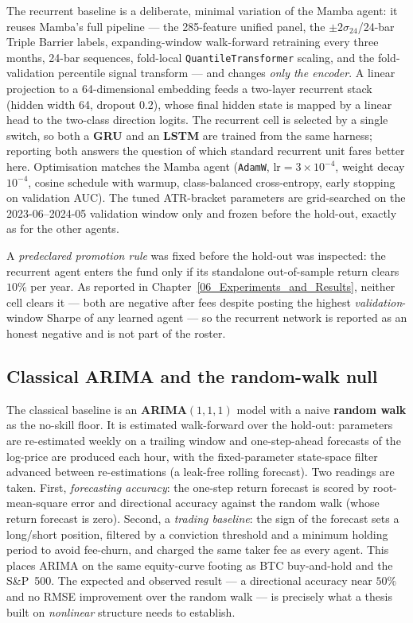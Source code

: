 The recurrent baseline is a deliberate, minimal variation of the Mamba agent: it reuses Mamba's full pipeline --- the 285-feature unified panel, the $\pm 2\sigma_{24}$/24-bar Triple Barrier labels, expanding-window walk-forward retraining every three months, 24-bar sequences, fold-local \texttt{QuantileTransformer} scaling, and the fold-validation percentile signal transform --- and changes \textit{only the encoder}. A linear projection to a 64-dimensional embedding feeds a two-layer recurrent stack (hidden width 64, dropout 0.2), whose final hidden state is mapped by a linear head to the two-class direction logits. The recurrent cell is selected by a single switch, so both a \textbf{GRU} and an \textbf{LSTM} are trained from the same harness; reporting both answers the question of which standard recurrent unit fares better here. Optimisation matches the Mamba agent (\texttt{AdamW}, $\text{lr}=3\times10^{-4}$, weight decay $10^{-4}$, cosine schedule with warmup, class-balanced cross-entropy, early stopping on validation AUC). The tuned ATR-bracket parameters are grid-searched on the 2023-06--2024-05 validation window only and frozen before the hold-out, exactly as for the other agents.


A \textit{predeclared promotion rule} was fixed before the hold-out was inspected: the recurrent agent enters the fund only if its standalone out-of-sample return clears $10\%$ per year. As reported in Chapter~\ref{06_Experiments_and_Results}, neither cell clears it --- both are negative after fees despite posting the highest \textit{validation}-window Sharpe of any learned agent --- so the recurrent network is reported as an honest negative and is not part of the roster.

\subsection{Classical ARIMA and the random-walk null}
\label{sec:arima_baseline}

The classical baseline is an \textbf{ARIMA$(1,1,1)$} model with a naive \textbf{random walk} as the no-skill floor. It is estimated walk-forward over the hold-out: parameters are re-estimated weekly on a trailing window and one-step-ahead forecasts of the log-price are produced each hour, with the fixed-parameter state-space filter advanced between re-estimations (a leak-free rolling forecast). Two readings are taken. First, \textit{forecasting accuracy}: the one-step return forecast is scored by root-mean-square error and directional accuracy against the random walk (whose return forecast is zero). Second, a \textit{trading baseline}: the sign of the forecast sets a long/short position, filtered by a conviction threshold and a minimum holding period to avoid fee-churn, and charged the same taker fee as every agent. This places ARIMA on the same equity-curve footing as BTC buy-and-hold and the S\&P~500. The expected and observed result --- a directional accuracy near $50\%$ and no RMSE improvement over the random walk --- is precisely what a thesis built on \textit{nonlinear} structure needs to establish.

